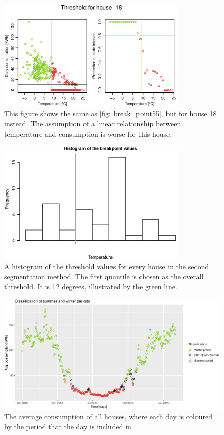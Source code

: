 \begin{figure}[H]
    \centering
    \includegraphics[width=0.8\textwidth]{../../../figures/breakpoint_18.eps}
    \caption{This figure shows the same as \cref{fig: break_point55}, but for house 18 instead. The assumption of a linear relationship between temperature and consumption is worse for this house.}
    \label{fig: break_point18}
\end{figure}
\begin{figure}[H]
    \centering
    \includegraphics[width=0.8\textwidth]{../../../figures/AlphaHist.eps}
    \caption{A histogram of the threshold values for every house in the second segmentation method. The first quantile is chosen as the overall threshold. It is 12 degrees, illustrated by the green line.}
    \label{fig: AlphaHist}
\end{figure}

\begin{figure}[H]
    \centering
    \includegraphics[width=1.\textwidth]{../../../figures/class_breakpoint.eps}
    \caption{The average consumption of all houses, where each day is coloured by the period that the day is included in.}
    \label{fig: class_break_point}
\end{figure}
